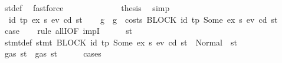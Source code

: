 \begin{isabellebody}
\ st{\isacharprime}{\kern0pt}{\isacharunderscore}{\kern0pt}def\ \isamarkupfalse%
\ fastforce\isanewline
\ \ \ \ \ \ \ \ \ \ \isamarkupfalse%
\ \isamarkupfalse%
\ {\isacharquery}{\kern0pt}thesis\ \isamarkupfalse%
\ simp\isanewline
\ \ \ \ \ \ \ \ \isamarkupfalse%
\isanewline
\ \ \ \ \ \ \isamarkupfalse%
\isanewline
\ \ \ \ \isamarkupfalse%
\isanewline
\ \ \isamarkupfalse%
\isanewline
{}\isamarkupfalse%
\isanewline
\ \ \isamarkupfalse%
\ {\isacharparenleft}{\kern0pt}{}{}\ id{}\ tp\ ex{\isacharprime}{\kern0pt}\ s\ e\isactrlsub v\ cd\ st{\isacharparenright}{\kern0pt}\isanewline
\ \ \isamarkupfalse%
\ g\ \ {\isachardoublequoteopen}g\ {\isacharequal}{\kern0pt}\ costs\ {\isacharparenleft}{\kern0pt}BLOCK\ {\isacharparenleft}{\kern0pt}{\isacharparenleft}{\kern0pt}id{}{\isacharcomma}{\kern0pt}\ tp{\isacharparenright}{\kern0pt}{\isacharcomma}{\kern0pt}\ Some\ ex{\isacharprime}{\kern0pt}{\isacharparenright}{\kern0pt}\ s{\isacharparenright}{\kern0pt}\ e\isactrlsub v\ cd\ st{\isachardoublequoteclose}\isanewline
\ \ \isamarkupfalse%
\ {\isacharquery}{\kern0pt}case\isanewline
\ \ \isamarkupfalse%
\ {\isacharparenleft}{\kern0pt}rule\ allI{\isacharbrackleft}{\kern0pt}OF\ impI{\isacharbrackright}{\kern0pt}{\isacharparenright}{\kern0pt}\isanewline
\ \ \ \ \isamarkupfalse%
\ st{}{\isacharprime}{\kern0pt}\ \isamarkupfalse%
\ stmt{\isacharunderscore}{\kern0pt}def{\isacharcolon}{\kern0pt}\ {\isachardoublequoteopen}stmt\ {\isacharparenleft}{\kern0pt}BLOCK\ {\isacharparenleft}{\kern0pt}{\isacharparenleft}{\kern0pt}id{}{\isacharcomma}{\kern0pt}\ tp{\isacharparenright}{\kern0pt}{\isacharcomma}{\kern0pt}\ Some\ ex{\isacharprime}{\kern0pt}{\isacharparenright}{\kern0pt}\ s{\isacharparenright}{\kern0pt}\ e\isactrlsub v\ cd\ st\ {\isacharequal}{\kern0pt}\ Normal\ {\isacharparenleft}{\kern0pt}{\isacharparenleft}{\kern0pt}{\isacharparenright}{\kern0pt}{\isacharcomma}{\kern0pt}\ st{}{\isacharprime}{\kern0pt}{\isacharparenright}{\kern0pt}{\isachardoublequoteclose}\isanewline
\ \ \ \ \isamarkupfalse%
\ {\isachardoublequoteopen}gas\ st{}{\isacharprime}{\kern0pt}\ {\isasymle}\ gas\ st{\isachardoublequoteclose}\isanewline
\ \ \ \ \isamarkupfalse%
\ cases\isanewline
\ \ \ \ \ \ \isamarkupfalse%

\end{isabellebody}
